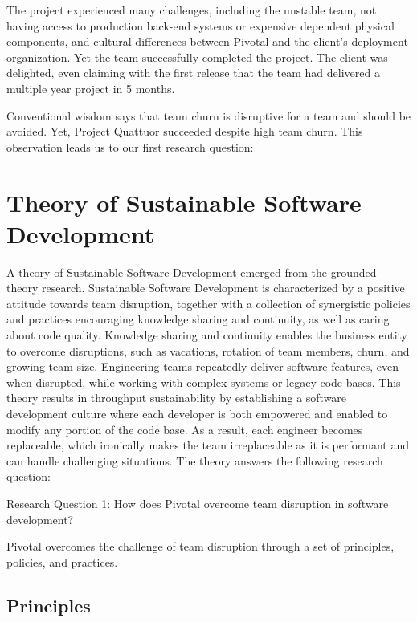 The project experienced many challenges, including the unstable team, not having access to production back-end systems or expensive dependent physical components, and cultural differences between Pivotal and the client's deployment organization. Yet the team successfully completed the project. The client was delighted, even claiming with the first release that the team had delivered a multiple year project in 5 months. 

Conventional wisdom says that team churn is disruptive for a team and should be avoided. Yet, Project Quattuor succeeded despite high team churn. This observation leads us to our first research question: 

\section{Theory of Sustainable Software Development}
\label{Theory}

A theory of Sustainable Software Development emerged from the grounded theory research. Sustainable Software Development is characterized by a positive attitude towards team disruption, together with a collection of synergistic policies and practices encouraging knowledge sharing and continuity, as well as caring about code quality. Knowledge sharing and continuity enables the business entity to overcome disruptions, such as vacations, rotation of team members, churn, and growing team size. Engineering teams repeatedly deliver software features, even when disrupted, while working with complex systems or legacy code bases. This theory results in throughput sustainability by establishing a software development culture where each developer is both empowered and enabled to modify any portion of the code base. As a result, each engineer becomes replaceable, which ironically makes the team irreplaceable as it is performant and can handle challenging situations. The theory answers the following research question:

Research Question 1: How does Pivotal overcome team disruption in software development?

Pivotal overcomes the challenge of team disruption through a set of principles, policies, and practices.

\subsection{Principles}


